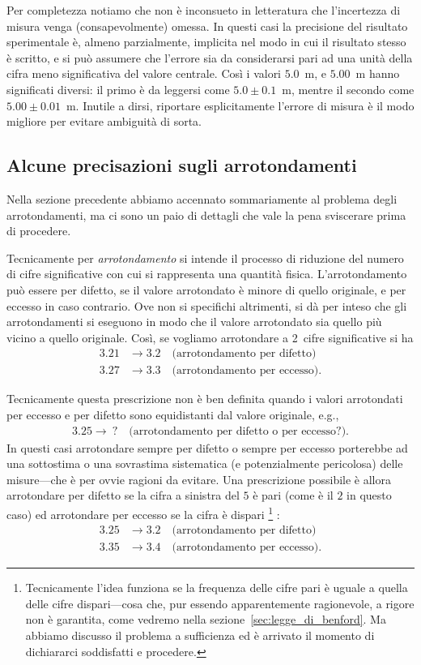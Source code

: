 Per completezza notiamo che non è inconsueto in letteratura che l'incertezza
di misura venga (consapevolmente) omessa. In questi casi la precisione del
risultato sperimentale è, almeno parzialmente, implicita nel modo in cui il
risultato stesso è scritto, e si può assumere che l'errore sia da
considerarsi pari ad una unità della cifra meno significativa del valore
centrale. Così i valori $5.0$~m, e $5.00$~m hanno significati diversi:
il primo è da leggersi come $5.0 \pm 0.1$~m, mentre il secondo come
$5.00 \pm 0.01$~m. Inutile a dirsi, riportare esplicitamente l'errore di misura
è il modo migliore per evitare ambiguità di sorta.


\subsection{Alcune precisazioni sugli arrotondamenti}

Nella sezione precedente abbiamo accennato sommariamente al problema degli
arrotondamenti, ma ci sono un paio di dettagli che vale la pena sviscerare
prima di procedere.

Tecnicamente per \emph{arrotondamento} si intende il processo di riduzione
del numero di cifre significative con cui si rappresenta una quantità fisica.
L'arrotondamento può essere per difetto, se il valore arrotondato è minore
di quello originale, e per eccesso in caso contrario. Ove non si specifichi
altrimenti, si dà per inteso che gli arrotondamenti si eseguono in modo
che il valore arrotondato sia quello più vicino a quello originale. Così, se
vogliamo arrotondare a 2~cifre significative si ha
\begin{align*}
  3.21 & \rightarrow 3.2 \quad \text{(arrotondamento per difetto)} \\
  3.27 & \rightarrow 3.3 \quad \text{(arrotondamento per eccesso).}
\end{align*}

Tecnicamente questa prescrizione non è ben definita quando i valori
arrotondati per eccesso e per difetto sono equidistanti dal valore originale,
e.g.,
\begin{align*}
  3.25 \rightarrow\ ? \quad \text{(arrotondamento per difetto o per eccesso?).}
\end{align*}
In questi casi arrotondare sempre per difetto o sempre per eccesso porterebbe
ad una sottostima o una sovrastima sistematica (e potenzialmente pericolosa)
delle misure---che è per ovvie ragioni da evitare. Una prescrizione possibile
è allora arrotondare per difetto se la cifra a sinistra del $5$ è pari
(come è il $2$ in questo caso) ed arrotondare per eccesso se la cifra è
dispari%
\footnote{Tecnicamente l'idea funziona se la frequenza delle cifre pari è
  uguale a quella delle cifre dispari---cosa che, pur essendo apparentemente
  ragionevole, a rigore non è garantita, come vedremo nella
  sezione~\ref{sec:legge_di_benford}.
  Ma abbiamo discusso il problema a sufficienza ed è arrivato il momento di
  dichiararci soddisfatti e procedere.}%
:
\begin{align*}
  3.25 & \rightarrow 3.2 \quad \text{(arrotondamento per difetto)} \\
  3.35 & \rightarrow 3.4 \quad \text{(arrotondamento per eccesso).}
\end{align*}


